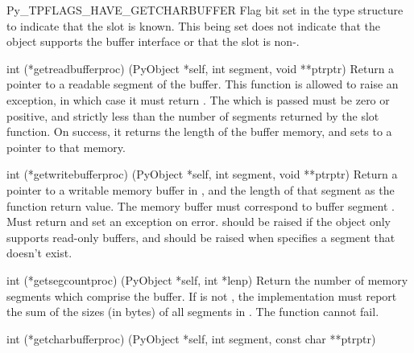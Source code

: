 \begin{datadesc}{Py_TPFLAGS_HAVE_GETCHARBUFFER}
  Flag bit set in the type structure to indicate that the
   slot is known.  This being set does not
  indicate that the object supports the buffer interface or that the
   slot is non-\NULL.
\end{datadesc}

\begin{ctypedesc}[getreadbufferproc]{int (*getreadbufferproc)
                            (PyObject *self, int segment, void **ptrptr)}
  Return a pointer to a readable segment of the buffer.  This function
  is allowed to raise an exception, in which case it must return
  .  The  which is passed must be zero or
  positive, and strictly less than the number of segments returned by
  the  slot function.  On success, it returns
  the length of the buffer memory, and sets  to a
  pointer to that memory.
\end{ctypedesc}

\begin{ctypedesc}[getwritebufferproc]{int (*getwritebufferproc)
                            (PyObject *self, int segment, void **ptrptr)}
  Return a pointer to a writable memory buffer in
  , and the length of that segment as the function
  return value.  The memory buffer must correspond to buffer segment
  .  Must return  and set an exception on
  error.   should be raised if the object only
  supports read-only buffers, and  should be
  raised when  specifies a segment that doesn't exist.
\end{ctypedesc}

\begin{ctypedesc}[getsegcountproc]{int (*getsegcountproc)
                            (PyObject *self, int *lenp)}
  Return the number of memory segments which comprise the buffer.  If
   is not \NULL, the implementation must report the sum of
  the sizes (in bytes) of all segments in .
  The function cannot fail.
\end{ctypedesc}

\begin{ctypedesc}[getcharbufferproc]{int (*getcharbufferproc)
                            (PyObject *self, int segment, const char **ptrptr)}
\end{ctypedesc}


